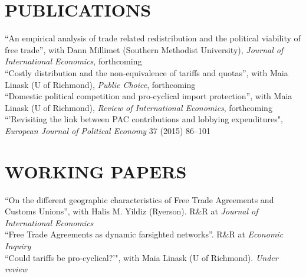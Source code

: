 \documentclass[11pt]{res}
\begin{document}
\begin{resume}
\section{PUBLICATIONS}\vspace{1.5mm}
{``An empirical analysis of trade related redistribution and the political viability of free trade''}, with Dann Millimet (Southern Methodist University), \emph{Journal of International Economics}, forthcoming \vspace{1.5mm}\\
{``Costly distribution and the non-equivalence of tariffs and quotas''}, with Maia Linask (U of Richmond), \emph{Public Choice}, forthcoming \vspace{1.5mm}\\
{``Domestic political competition and pro-cyclical import protection''}, with Maia Linask (U of Richmond), \emph{Review of International Economics}, forthcoming\vspace{1.5mm}\\
{``'Revisiting the link between PAC contributions and lobbying expenditures", \emph{European Journal of Political Economy}} 37 (2015) 86--101 \vspace{1.5mm}\\

\section{WORKING PAPERS}\vspace{1.5mm}
{``On the different geographic characteristics of Free Trade Agreements and Customs Unions''}, with Halis M. Yildiz (Ryerson). R\&R at \emph{Journal of International Economics}\vspace{1.5mm}\\
{ ``Free Trade Agreements as dynamic farsighted networks''}. R\&R at \emph{Economic Inquiry} \vspace{1.5mm}\\
{``Could tariffs be pro-cyclical?'"}, with Maia Linask (U of Richmond). \emph{Under review}\vspace{1.5mm}\\



\end{resume}
\end{document}
